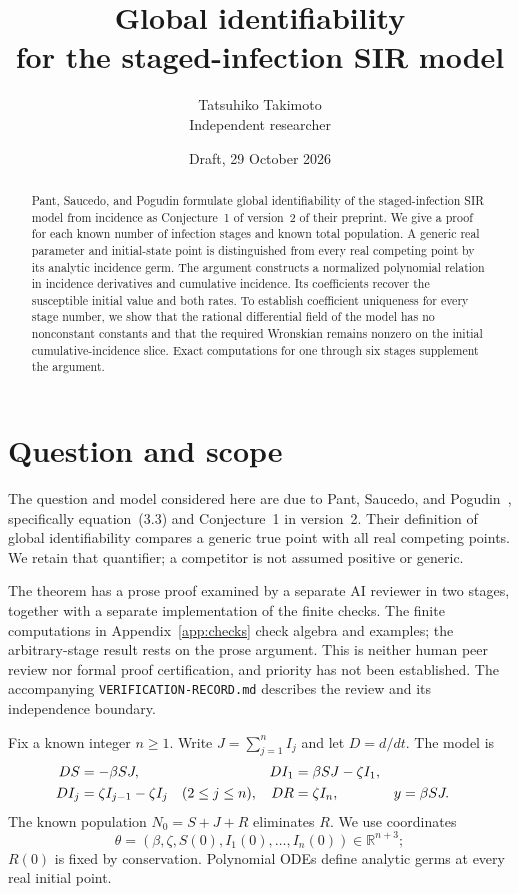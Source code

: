 \documentclass[11pt,a4paper]{article}
\title{Global identifiability\\ for the staged-infection SIR model}
\author{Tatsuhiko Takimoto\\Independent researcher}
\date{Draft, 29 October 2026}
\newcommand{\R}{\mathbb{R}}
\begin{document}
\maketitle
\begin{abstract}
Pant, Saucedo, and Pogudin formulate global identifiability of the staged-infection SIR model from incidence as Conjecture~1 of version~2 of their preprint. We give a proof for each known number of infection stages and known total population. A generic real parameter and initial-state point is distinguished from every real competing point by its analytic incidence germ. The argument constructs a normalized polynomial relation in incidence derivatives and cumulative incidence. Its coefficients recover the susceptible initial value and both rates. To establish coefficient uniqueness for every stage number, we show that the rational differential field of the model has no nonconstant constants and that the required Wronskian remains nonzero on the initial cumulative-incidence slice. Exact computations for one through six stages supplement the argument.
\end{abstract}

\section{Question and scope}
The question and model considered here are due to Pant, Saucedo, and Pogudin~\cite{PSP}, specifically equation~(3.3) and Conjecture~1 in version~2. Their definition of global identifiability compares a generic true point with all real competing points. We retain that quantifier; a competitor is not assumed positive or generic.

The theorem has a prose proof examined by a separate AI reviewer in two stages, together with a separate implementation of the finite checks. The finite computations in Appendix~\ref{app:checks} check algebra and examples; the arbitrary-stage result rests on the prose argument. This is neither human peer review nor formal proof certification, and priority has not been established. The accompanying \texttt{VERIFICATION-RECORD.md} describes the review and its independence boundary.

Fix a known integer $n\geq1$. Write $J=\sum_{j=1}^n I_j$ and let $D=d/dt$. The model is
\begin{align}
 DS&=-\beta SJ,& DI_1&=\beta SJ-\zeta I_1,\notag\\
 DI_j&=\zeta I_{j-1}-\zeta I_j\quad(2\leq j\leq n),&
 DR&=\zeta I_n, & y&=\beta SJ.\label{eq:model}
\end{align}
The known population $N_0=S+J+R$ eliminates $R$. We use coordinates
\[\theta=(\beta,\zeta,S(0),I_1(0),\ldots,I_n(0))\in\R^{n+3};\]
$R(0)$ is fixed by conservation. Polynomial ODEs define analytic germs at every real initial point.
\end{document}
